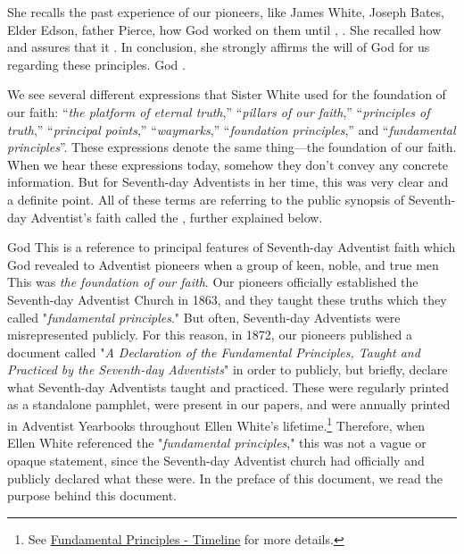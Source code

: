 She recalls the past experience of our pioneers, like James White, Joseph Bates, Elder Edson, father Pierce, how God worked on them until , . She recalled how  and assures that it . In conclusion, she strongly affirms the will of God for us regarding these principles. God . 

We see several different expressions that Sister White used for the foundation of our faith: “\textit{the platform of eternal truth},” “\textit{pillars of our faith},” “\textit{principles of truth},” “\textit{principal points},” “\textit{waymarks},” “\textit{foundation principles},” and “\textit{fundamental principles}”. These expressions denote the same thing—the foundation of our faith. When we hear these expressions today, somehow they don’t convey any concrete information. But for Seventh-day Adventists in her time, this was very clear and a definite point. All of these terms are referring to the public synopsis of Seventh-day Adventist’s faith called the , further explained below.

God  This is a reference to principal features of Seventh-day Adventist faith which God revealed to Adventist pioneers  when a group of keen, noble, and true men  This was \textit{the foundation of our faith}. Our pioneers officially established the Seventh-day Adventist Church in 1863, and they taught these truths which they called "\textit{fundamental principles}." But often, Seventh-day Adventists were misrepresented publicly. For this reason, in 1872, our pioneers published a document called "\textit{A Declaration of the Fundamental Principles, Taught and Practiced by the Seventh-day Adventists}" in order to publicly, but briefly, declare what  Seventh-day Adventists taught and practiced. These  were regularly printed as a standalone pamphlet, were present in our papers, and were annually printed in Adventist Yearbooks throughout Ellen White's lifetime.\footnote{See \hyperref[appendix:timeline]{Fundamental Principles - Timeline} for more details.} Therefore, when Ellen White referenced the "\textit{fundamental principles}," this was not a vague or opaque statement, since the Seventh-day Adventist church had officially and publicly declared what these  were. In the preface of this document, we read the purpose behind this document.

